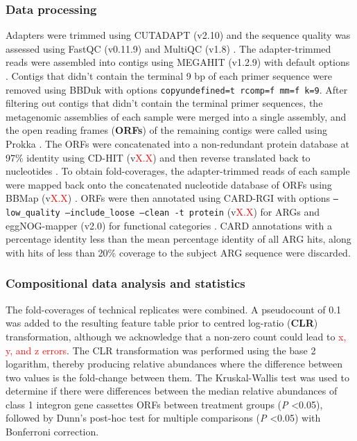 \subsubsection{Data processing} \label{methods:C1I_data-processing}

Adapters were trimmed using CUTADAPT (v2.10) and the sequence quality was assessed using FastQC (v0.11.9) and MultiQC (v1.8) \parencite{martinCutadaptRemovesAdapter2011, andrewsFastQCQualityControl2010, ewelsMultiQCSummarizeAnalysis2016}.
The adapter-trimmed reads were assembled into contigs using MEGAHIT (v1.2.9) with default options \parencite{liMEGAHITUltrafastSinglenode2015}.
Contigs that didn't contain the terminal 9 bp of each primer sequence were removed using BBDuk with options \texttt{copyundefined=t rcomp=f mm=f k=9}.
After filtering out contigs that didn't contain the terminal primer sequences, the metagenomic assemblies of each sample were merged into a single assembly, and the open reading frames (\textbf{ORFs}) of the remaining contigs were called using Prokka \parencite{bushnellBBMap2020, seemannProkkaRapidProkaryotic2014}.
The ORFs were concatenated into a non-redundant protein database at 97\% identity using CD-HIT (v\textcolor{red}{X.X}) and then reverse translated back to nucleotides \parencite{liCDHITFastProgram2006, fuCDHITAcceleratedClustering2012}.
To obtain fold-coverages, the adapter-trimmed reads of each sample were mapped back onto the concatenated nucleotide database of ORFs using BBMap (v\textcolor{red}{X.X}) \parencite{bushnellBBMap2020}.
ORFs were then annotated using CARD-RGI with options \texttt{--low\_quality --include\_loose --clean -t protein} (v\textcolor{red}{X.X}) for ARGs and eggNOG-mapper (v2.0) for functional categories \parencite{alcockCARD2020Antibiotic2019, huerta-cepasFastGenomewideFunctional2017, huerta-cepasEggNOGHierarchicalFunctionally2019}.
CARD annotations with a percentage identity less than the mean percentage identity of all ARG hits, along with hits of less than 20\% coverage to the subject ARG sequence were discarded.

\subsubsection{Compositional data analysis and statistics} \label{methods:C1I_CoDA}

The fold-coverages of technical replicates were combined.
A pseudocount of 0.1 was added to the resulting feature table prior to centred log-ratio (\textbf{CLR}) transformation, although we acknowledge that a non-zero count could lead to \textcolor{red}{x, y, and z errors}.
The CLR transformation was performed using the base 2 logarithm, thereby producing relative abundances where the difference between two values is the fold-change between them.
The Kruskal-Wallis test was used to determine if there were differences between the median relative abundances of class 1 integron gene cassettes ORFs between treatment groups (\textit{P} \textless 0.05), followed by Dunn's post-hoc test for multiple comparisons (\textit{P} \textless 0.05) with Bonferroni correction.

